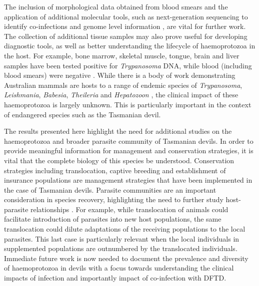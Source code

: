 \documentclass[a4paper, nobind]{templates/ociamthesis}
\begin{document}
The inclusion of morphological data obtained from blood smears and the application of additional molecular tools, such as next-generation sequencing to identify co-infections \autocite{barbosaIncreasedGeneticDiversity2017} and genome level information \autocite{reis-cunhaWholeGenomeSequencing2018}, are vital for further work. The collection of additional tissue samples may also prove useful for developing diagnostic tools, as well as better understanding the lifecycle of haemoprotozoa in the host. For example, bone marrow, skeletal muscle, tongue, brain and liver samples have been tested positive for \emph{Trypanosoma} DNA, while blood (including blood smears) were negative \autocite{northoverDebilitatingDiseasePolyparasitised2018}. While there is a body of work demonstrating Australian mammals are hosts to a range of endemic species of \emph{Trypanosoma}, \emph{Leishmania}, \emph{Babesia}, \emph{Theileria} and \emph{Hepatozoon} \autocite{austenInvestigationMorphologicalDiversity2015,boteroMorphologicalPhylogeneticDescription2016,barbosaSequenceAnalysesMitochondrial2019,northoverIncreasedTrypanosomaSpp2019}, the clinical impact of these haemoprotozoa is largely unknown. This is particularly important in the context of endangered species such as the Tasmanian devil.

The results presented here highlight the need for additional studies on the haemoprotozoa and broader parasite community of Tasmanian devils. In order to provide meaningful information for management and conservation strategies, it is vital that the complete biology of this species be understood. Conservation strategies including translocation, captive breeding and establishment of insurance populations are management strategies that have been implemented in the case of Tasmanian devils. Parasite communities are an important consideration in species recovery, highlighting the need to further study host-parasite relationships \autocite{northoverHiddenConsequencesAltering2018}. For example, while translocation of animals could facilitate introduction of parasites into new host populations, the same translocation could dilute adaptations of the receiving populations to the local parasites. This last case is particularly relevant when the local individuals in supplemented populations are outnumbered by the translocated individuals. Immediate future work is now needed to document the prevalence and diversity of haemoprotozoa in devils with a focus towards understanding the clinical impacts of infection and importantly impact of co-infection with DFTD.
\end{document}
